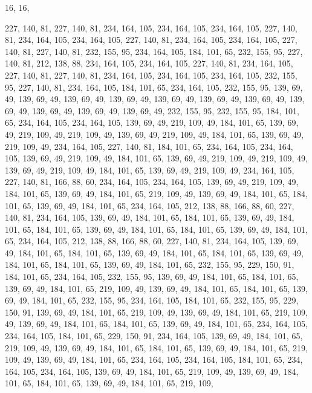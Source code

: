 16, 16,

227, 140, 81, 227, 140, 81, 234, 164, 105, 234, 164, 105, 234, 164, 105, 227,
140, 81, 234, 164, 105, 234, 164, 105, 227, 140, 81, 234, 164, 105, 234, 164,
105, 227, 140, 81, 227, 140, 81, 232, 155, 95, 234, 164, 105, 184, 101, 65,
232, 155, 95, 227, 140, 81, 212, 138, 88, 234, 164, 105, 234, 164, 105, 227,
140, 81, 234, 164, 105, 227, 140, 81, 227, 140, 81, 234, 164, 105, 234, 164,
105, 234, 164, 105, 232, 155, 95, 227, 140, 81, 234, 164, 105, 184, 101, 65,
234, 164, 105, 232, 155, 95, 139, 69, 49, 139, 69, 49, 139, 69, 49, 139,
69, 49, 139, 69, 49, 139, 69, 49, 139, 69, 49, 139, 69, 49, 139, 69,
49, 139, 69, 49, 139, 69, 49, 232, 155, 95, 232, 155, 95, 184, 101, 65,
234, 164, 105, 234, 164, 105, 139, 69, 49, 219, 109, 49, 184, 101, 65, 139,
69, 49, 219, 109, 49, 219, 109, 49, 139, 69, 49, 219, 109, 49, 184, 101,
65, 139, 69, 49, 219, 109, 49, 234, 164, 105, 227, 140, 81, 184, 101, 65,
234, 164, 105, 234, 164, 105, 139, 69, 49, 219, 109, 49, 184, 101, 65, 139,
69, 49, 219, 109, 49, 219, 109, 49, 139, 69, 49, 219, 109, 49, 184, 101,
65, 139, 69, 49, 219, 109, 49, 234, 164, 105, 227, 140, 81, 166, 88, 60,
234, 164, 105, 234, 164, 105, 139, 69, 49, 219, 109, 49, 184, 101, 65, 139,
69, 49, 184, 101, 65, 219, 109, 49, 139, 69, 49, 184, 101, 65, 184, 101,
65, 139, 69, 49, 184, 101, 65, 234, 164, 105, 212, 138, 88, 166, 88, 60,
227, 140, 81, 234, 164, 105, 139, 69, 49, 184, 101, 65, 184, 101, 65, 139,
69, 49, 184, 101, 65, 184, 101, 65, 139, 69, 49, 184, 101, 65, 184, 101,
65, 139, 69, 49, 184, 101, 65, 234, 164, 105, 212, 138, 88, 166, 88, 60,
227, 140, 81, 234, 164, 105, 139, 69, 49, 184, 101, 65, 184, 101, 65, 139,
69, 49, 184, 101, 65, 184, 101, 65, 139, 69, 49, 184, 101, 65, 184, 101,
65, 139, 69, 49, 184, 101, 65, 232, 155, 95, 229, 150, 91, 184, 101, 65,
234, 164, 105, 232, 155, 95, 139, 69, 49, 184, 101, 65, 184, 101, 65, 139,
69, 49, 184, 101, 65, 219, 109, 49, 139, 69, 49, 184, 101, 65, 184, 101,
65, 139, 69, 49, 184, 101, 65, 232, 155, 95, 234, 164, 105, 184, 101, 65,
232, 155, 95, 229, 150, 91, 139, 69, 49, 184, 101, 65, 219, 109, 49, 139,
69, 49, 184, 101, 65, 219, 109, 49, 139, 69, 49, 184, 101, 65, 184, 101,
65, 139, 69, 49, 184, 101, 65, 234, 164, 105, 234, 164, 105, 184, 101, 65,
229, 150, 91, 234, 164, 105, 139, 69, 49, 184, 101, 65, 219, 109, 49, 139,
69, 49, 184, 101, 65, 184, 101, 65, 139, 69, 49, 184, 101, 65, 219, 109,
49, 139, 69, 49, 184, 101, 65, 234, 164, 105, 234, 164, 105, 184, 101, 65,
234, 164, 105, 234, 164, 105, 139, 69, 49, 184, 101, 65, 219, 109, 49, 139,
69, 49, 184, 101, 65, 184, 101, 65, 139, 69, 49, 184, 101, 65, 219, 109,
